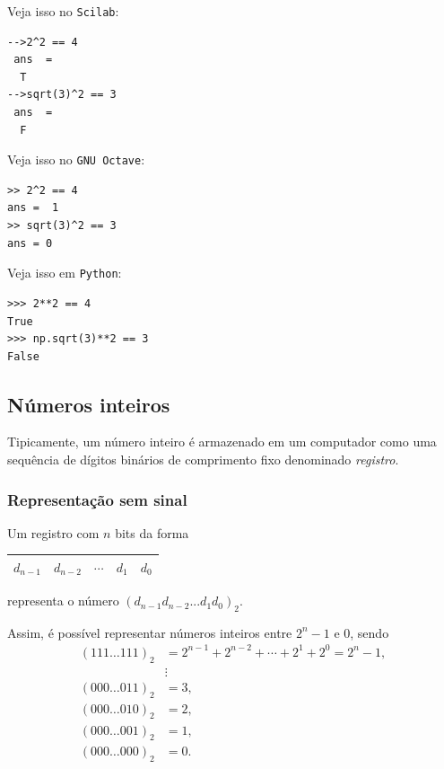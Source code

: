 \ifisscilab
Veja isso no \verb+Scilab+:
\begin{verbatim}
-->2^2 == 4
 ans  =
  T  
-->sqrt(3)^2 == 3
 ans  =
  F  
\end{verbatim}
\fi
\ifisoctave
Veja isso no \verb+GNU Octave+:
\begin{verbatim}
>> 2^2 == 4
ans =  1
>> sqrt(3)^2 == 3
ans = 0
\end{verbatim}
\fi
\ifispython
Veja isso em \verb+Python+:
\begin{verbatim}
>>> 2**2 == 4
True
>>> np.sqrt(3)**2 == 3
False
\end{verbatim}
\fi

\subsection{Números inteiros}

Tipicamente, um número inteiro é armazenado em um computador como uma sequência de dígitos binários de comprimento fixo denominado \emph{registro}.

\subsubsection{Representação sem sinal}
Um registro com $n$ bits da forma
 \begin{center}
   \begin{tabular}{|c|c|c|c|c|}\hline
     $d_{n-1}$ & $d_{n-2}$ & $\cdots$ & $d_1$ & $d_0$\\\hline
   \end{tabular}  
 \end{center}
representa o número $(d_{n-1}d_{n-2}...d_1d_0)_2$. 

Assim, é possível representar números inteiros entre $2^n-1$ e $0$, sendo
\begin{equation*}
\begin{split}
  (111\ldots 111)_2 & = 2^{n-1}+2^{n-2}+\cdots+2^1+2^0=2^n-1,\\
                &\vdots\\
  (000\ldots 011)_2 &= 3, \\
  (000\ldots 010)_2 &= 2, \\
  (000\ldots 001)_2 &= 1, \\
  (000\ldots 000)_2 & = 0. 
\end{split}
\end{equation*}

